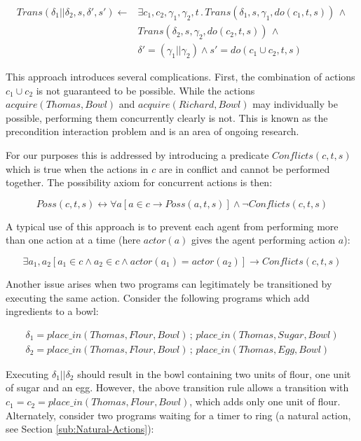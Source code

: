 \documentclass[letterpaper]{article}
\begin{document}
\begin{align*}
Trans(\delta_{1}||\delta_{2},s,\delta',s')\leftarrow & \exists c_{1},c_{2},\gamma_{1},\gamma_{2},t\,.\, Trans(\delta_{1},s,\gamma_{1},do(c_{1},t,s))\,\wedge\\
 & Trans(\delta_{2},s,\gamma_{2},do(c_{2},t,s))\,\wedge\\
 & \delta'=(\gamma_{1}||\gamma_{2})\wedge s'=do(c_{1}\cup c_{2},t,s)
\end{align*}


This approach introduces several complications. First, the combination
of actions $c_{1}\cup c_{2}$ is not guaranteed to be possible. While
the actions $acquire(Thomas,Bowl)$ and $acquire(Richard,Bowl)$ may
individually be possible, performing them concurrently clearly is
not. This is known as the precondition interaction problem \cite{pinto94temporal}
and is an area of ongoing research.

For our purposes this is addressed by introducing a predicate $Conflicts(c,t,s)$
which is true when the actions in $c$ are in conflict and cannot
be performed together. The possibility axiom for concurrent actions
is then:

\[
Poss(c,t,s)\leftrightarrow\forall a\left[a\in c\rightarrow Poss(a,t,s)\right]\wedge\neg Conflicts(c,t,s)
\]


A typical use of this approach is to prevent each agent from performing
more than one action at a time (here $actor(a)$ gives the agent performing
action $a$):

\[
\exists a_{1},a_{2}\left[a_{1}\in c\wedge a_{2}\in c\wedge actor(a_{1})=actor(a_{2})\right]\rightarrow Conflicts(c,t,s)
\]

Another issue arises when two programs can legitimately be transitioned
by executing the same action. Consider the following programs which
add ingredients to a bowl:

\begin{align*}
\delta_{1}=place\_ in(Thomas,Flour,Bowl)\,;\, place\_ in(Thomas,Sugar,Bowl)\\
\delta_{2}=place\_ in(Thomas,Flour,Bowl)\,;\, place\_ in(Thomas,Egg,Bowl)
\end{align*}


Executing $\delta_{1}||\delta_{2}$ should result in the bowl containing
two units of flour, one unit of sugar and an egg. However, the above
transition rule allows a transition with $c_{1}=c_{2}=place\_ in(Thomas,Flour,Bowl)$,
which adds only one unit of flour. Alternately, consider two programs
waiting for a timer to ring (a natural action, see Section \ref{sub:Natural-Actions}):
\end{document}

